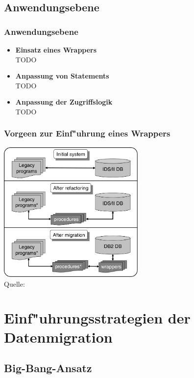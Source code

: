 \documentclass{beamer}
\begin{document}
	\subsection{Anwendungsebene}
	
	\begin{frame}
		\frametitle{Anwendungsebene}
		
		\begin{itemize}
			\item \textbf{Einsatz eines Wrappers} \\
				TODO %
			\item \textbf{Anpassung von Statements} \\
				TODO %
			\item \textbf{Anpassung der Zugriffslogik} \\
				TODO %
		\end{itemize}
	\end{frame}
	
	\begin{frame}
		\frametitle{Vorgeen zur Einf"uhrung eines Wrappers}
		
		\centering
		\includegraphics[height = 7cm]{../images/large_scale_fig_01.png} \\
		\tiny Quelle: \cite{henrard-2008}
	\end{frame}
	
	\section{Einf"uhrungsstrategien der Datenmigration}
	
	\subsection{Big-Bang-Ansatz}
	
\end{document}
